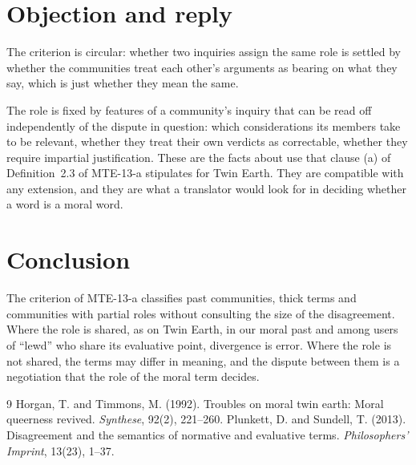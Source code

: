 \documentclass{situationist-preprint}
\begin{document}
\section{Objection and reply}

\begin{objection}
The criterion is circular: whether two inquiries assign the same role is settled by whether the communities treat each other's arguments as bearing on what they say, which is just whether they mean the same.
\end{objection}

\begin{reply}
The role is fixed by features of a community's inquiry that can be read off independently of the dispute in question: which considerations its members take to be relevant, whether they treat their own verdicts as correctable, whether they require impartial justification. These are the facts about use that clause (a) of Definition~2.3 of MTE-13-a stipulates for Twin Earth. They are compatible with any extension, and they are what a translator would look for in deciding whether a word is a moral word.
\end{reply}

\section{Conclusion}

The criterion of MTE-13-a classifies past communities, thick terms and communities with partial roles without consulting the size of the disagreement. Where the role is shared, as on Twin Earth, in our moral past and among users of \enquote{lewd} who share its evaluative point, divergence is error. Where the role is not shared, the terms may differ in meaning, and the dispute between them is a negotiation that the role of the moral term decides.

\begin{thebibliography}{9}\small
{} Horgan, T. and Timmons, M. (1992). Troubles on moral twin earth: Moral queerness revived. \emph{Synthese}, 92(2), 221--260.
 Plunkett, D. and Sundell, T. (2013). Disagreement and the semantics of normative and evaluative terms. \emph{Philosophers' Imprint}, 13(23), 1--37.
\end{thebibliography}
\end{document}
